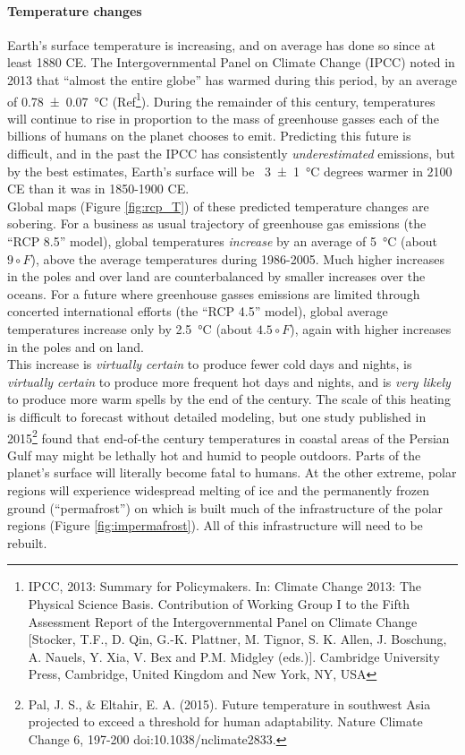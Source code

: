 \paragraph{Temperature changes}
Earth's surface temperature is increasing, and on average has done so since at least 1880 CE. The Intergovernmental Panel on Climate Change (IPCC) noted in 2013 that ``almost the entire globe'' has warmed during this period, by an average of \SI{0.78(7)}{\degreeCelsius} (Ref\footnote{IPCC, 2013: Summary for Policymakers. In: Climate Change 2013: The Physical Science Basis. Contribution of
Working Group I to the Fifth Assessment Report of the Intergovernmental Panel on Climate Change [Stocker,
T.F., D. Qin, G.-K. Plattner, M. Tignor, S. K. Allen, J. Boschung, A. Nauels, Y. Xia, V. Bex and P.M. Midgley (eds.)]. Cambridge University Press, Cambridge, United Kingdom and New York, NY, USA}). During the remainder of this century, temperatures will continue to rise in proportion to the mass of greenhouse gasses each of the billions of humans on the planet chooses to emit. Predicting this future is difficult, and in the past the IPCC has consistently \emph{underestimated} emissions, but by the best estimates, Earth's surface will be ~\SI{3(1)}{\degreeCelsius} degrees warmer in 2100 CE than it was in 1850-1900 CE. \\

Global maps (Figure \ref{fig:rcp_T}) of these predicted temperature changes are sobering. For a business as usual trajectory of greenhouse gas emissions (the ``RCP 8.5'' model), global temperatures \emph{increase} by an average of \SI{5}{\degreeCelsius} (about $9 \circ F$), above the average temperatures during 1986-2005. Much higher increases in the poles and over land are counterbalanced by smaller increases over the oceans. For a future where greenhouse gasses emissions are limited through concerted international efforts (the ``RCP 4.5'' model), global average temperatures increase only by \SI{2.5}{\degreeCelsius} (about $4.5 \circ F$), again with higher increases in the poles and on land.\\ 

This increase is \emph{virtually certain} to produce fewer cold days and nights, is \emph{virtually certain} to produce more frequent hot days and nights, and is \emph{very likely} to produce more warm spells by the end of the century. The scale of this heating is difficult to forecast without detailed modeling, but one study published in 2015\footnote{Pal, J. S., \& Eltahir, E. A. (2015). Future temperature in southwest Asia projected to exceed a threshold for human adaptability. Nature Climate Change 6, 197-200 doi:10.1038/nclimate2833.} found that end-of-the century temperatures in coastal areas of the Persian Gulf may might be lethally hot and humid to people outdoors. Parts of the planet's surface will literally become fatal to humans. At the other extreme, polar regions will experience widespread melting of ice and the permanently frozen ground (``permafrost'') on which is built much of the infrastructure of the polar regions (Figure \ref{fig:impermafrost}). All of this infrastructure will need to be rebuilt. 
 
